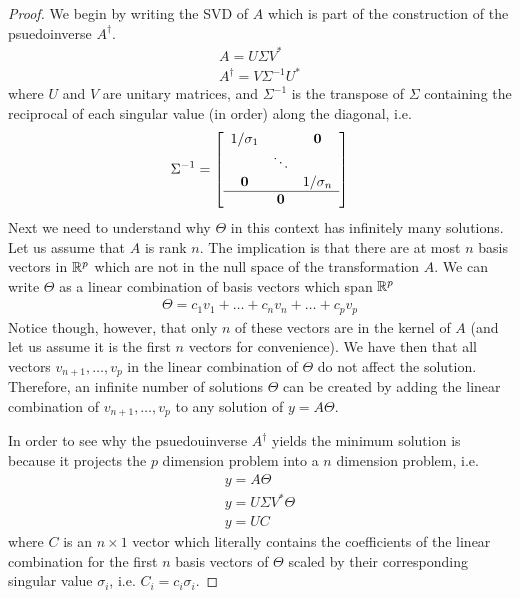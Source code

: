 \documentclass{article}
\begin{document}
\begin{proof}
    We begin by writing the SVD of $A$ which is part of the construction of the
    psuedoinverse $A^{\dagger}$. 
    \begin{gather*}
        A = U\Sigma V^*\\
        A^{\dagger} = V\Sigma^{-1}U^*
    \end{gather*}
    where $U$ and $V$ are unitary matrices, and $\Sigma^{-1}$ is the transpose of $\Sigma$ containing the reciprocal
    of each singular value (in order) along the diagonal, i.e. 
    \begin{gather*}
        \Sigma^{-1} = \left[\begin{array}{c c c}
                            1/\sigma_1 & & \boldsymbol{0}  \\
                             &\ddots &  \\
                            \boldsymbol{0} & & 1/\sigma_n \\
                            \hline &\boldsymbol{0}&
                            \end{array}\right]
    \end{gather*}
    Next we need to understand why $\Theta$ in this context has infinitely many
    solutions. Let us assume that $A$ is rank $n$. The implication is that there
    are at most $n$ basis vectors in $\mathbb{R}^{p}$ which are not in the null space of
    the transformation $A$. We can write $\Theta$ as a linear combination
    of basis vectors which span $\mathbb{R}^{p}$
    \begin{gather*}
        \Theta = c_1v_1 + \ldots + c_nv_n + \ldots + c_pv_p
    \end{gather*}
    Notice though, however, that only $n$ of these vectors are in the kernel of
    $A$ (and let us assume it is the first $n$ vectors for convenience). We have
    then that all vectors $v_{n+1}, \ldots, v_{p}$ in the linear combination of
    $\Theta$ do not affect the solution. Therefore, an infinite number of
    solutions $\Theta$ can be created by adding the linear combination of
    $v_{n+1}, \ldots, v_p$ to any solution of $y = A\Theta$. 


    In order to see why the psuedouinverse $A^{\dagger}$ yields the minimum
    solution is because it projects the $p$ dimension problem into a $n$
    dimension problem, i.e.
    \begin{gather*}
        y = A\Theta \\
        y = U\Sigma V^*\Theta\\
        y = UC
    \end{gather*}
    where $C$ is an $n\times1$ vector which literally contains the coefficients
    of the linear combination for the first $n$ basis vectors of $\Theta$ scaled
    by their corresponding singular value $\sigma_i$, i.e. $C_i = c_i\sigma_i$. 


\end{proof}
\end{document}
